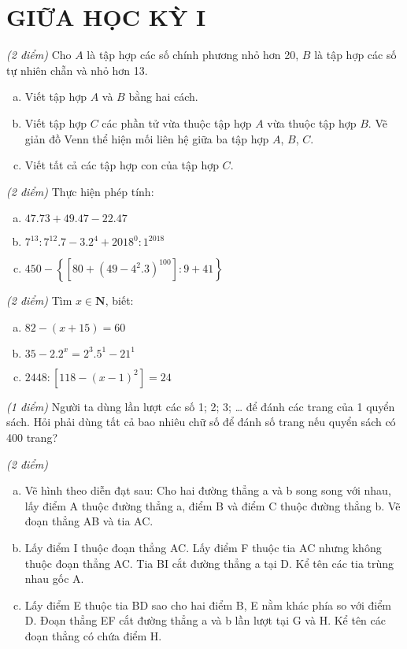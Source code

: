 \section{GIỮA HỌC KỲ I}
\setcounter{ex}{0}
\begin{ex}  \textit{(2 điểm)} Cho $A$ là tập hợp các số chính phương nhỏ hơn 20, $B$  là tập hợp các số tự nhiên chẵn và nhỏ hơn 13.
\begin{enumerate} [a)]
\item Viết tập hợp $A$ và $B$ bằng hai cách.
\item Viết tập hợp $C$ các phần tử vừa thuộc tập hợp $A$ vừa thuộc tập hợp $B$. Vẽ giản đồ Venn thể hiện mối liên hệ giữa ba tập hợp $A$, $B$, $C$.
\item Viết tất cả các tập hợp con của tập hợp $C$.

\end{enumerate}
\end{ex}     \begin{ex} \textit{(2 điểm)} Thực hiện phép tính:
\begin{enumerate} [a)]
\item $47.73 + 49.47 - 22.47$
\item ${7^{13}}:{7^{12}}.7 - {3.2^4} + {2018^0}:{1^{2018}}$
\item $450 - \left\{ {\left[ {80 + {{\left( {49 - {4^2}.3} \right)}^{100}}} \right]:9 + 41} \right\}$

\end{enumerate}
\end{ex}     \begin{ex} \textit{(2 điểm)} Tìm $x \in \mathbf{N}$, biết:
 \begin{enumerate}[a)]
\item $82 - \left( {x + 15} \right) = 60$
\item	$35 - {2.2^x} = {2^3}{.5^1} - {21^1}$
\item	$2448:\left[ {118 - {{\left( {x - 1} \right)}^2}} \right] = 24$

\end{enumerate}
\end{ex}     \begin{ex} \textit{(1 điểm)} Người ta dùng lần lượt các số 1; 2; 3; … để đánh các trang của 1 quyển sách. Hỏi phải dùng tất cả bao nhiêu chữ số để đánh số trang nếu quyển sách có 400 trang? \\
\end{ex}     \begin{ex} \textit{(2 điểm)} 
 \begin{enumerate}[a)]
\item Vẽ hình theo diễn đạt sau: Cho hai đường thẳng a và b song song với nhau, lấy điểm A thuộc đường thẳng a, điểm B và điểm C thuộc đường thẳng b. Vẽ đoạn thẳng AB và tia AC.
\item	Lấy điểm I thuộc đoạn thẳng AC. Lấy điểm F thuộc tia AC nhưng không thuộc đoạn thẳng AC. Tia BI cắt đường thẳng a tại D. Kể tên các tia trùng nhau gốc A.
\item	Lấy điểm E thuộc tia BD sao cho hai điểm B, E nằm khác phía so với điểm D. Đoạn thẳng EF cắt đường thẳng a và b lần lượt tại G và H. Kể tên các đoạn thẳng có chứa điểm H.


\end{enumerate}
\end{ex}

